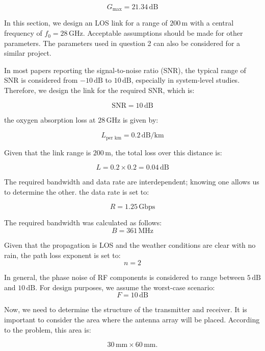 \documentclass[12pt,onecolumn,a4paper]{article}
\begin{document}
\[
G_{\text{max}} = 21.34 \, \text{dB} 
\]



In this section, we design an LOS link for a range of \(200 \, \text{m}\) with a central frequency of \(f_0 = 28 \, \text{GHz}\). Acceptable assumptions should be made for other parameters. The parameters used in question 2 can also be considered for a similar project.



In most papers reporting the signal-to-noise ratio (SNR), the typical range of SNR is considered from \(-10 \, \text{dB}\) to \(10 \, \text{dB}\), especially in system-level studies. Therefore, we design the link for the required SNR, which is:

\[
\text{SNR} = 10 \, \text{dB} 
\]



the oxygen absorption loss at \(28 \, \text{GHz}\) is given by:

\[
L_{\text{per km}} = 0.2 \, \text{dB/km} 
\]

Given that the link range is \(200 \, \text{m}\), the total loss over this distance is:

\[
L = 0.2 \times 0.2 = 0.04 \, \text{dB} 
\]



The required bandwidth and data rate are interdependent; knowing one allows us to determine the other. the data rate is set to:

\[
R = 1.25 \, \text{Gbps}
\]





The required bandwidth was calculated as follows:
\[
B = 361 \, \text{MHz} 
\]



Given that the propagation is LOS and the weather conditions are clear with no rain, the path loss exponent is set to:
\[
n = 2 
\]



In general, the phase noise of RF components is considered to range between \(5 \, \text{dB}\) and \(10 \, \text{dB}\). For design purposes, we assume the worst-case scenario:
\[
F = 10 \, \text{dB} 
\]






Now, we need to determine the structure of the transmitter and receiver. It is important to consider the area where the antenna array will be placed. According to the problem, this area is:

\[
30 \, \text{mm} \times 60 \, \text{mm}.
\]
\end{document}
